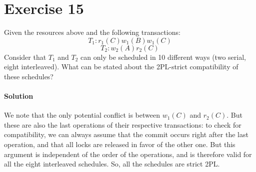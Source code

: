 \section{Exercise 15}

Given the resources above and the following transactions:
\[T_1: r_1(C) w_1(B) w_1(C)\] 
\[T_2: w_2(A) r_2(C)\]
Consider that $T_1$ and $T_2$ can only be scheduled in 10 different ways (two serial, eight interleaved). What can be stated about 
the 2PL-strict compatibility of these schedules? 

\paragraph*{Solution}
We note that the only potential conflict is between $w_1(C)$ and $r_2(C)$.
But these are also the last operations of their respective transactions: to check for compatibility, we can always assume that the commit occurs right after the last operation, and that all locks are released in favor of the other one. 
But this argument is independent of the order of the operations, and is therefore valid for all the eight interleaved schedules. So, all the schedules are strict 2PL. 